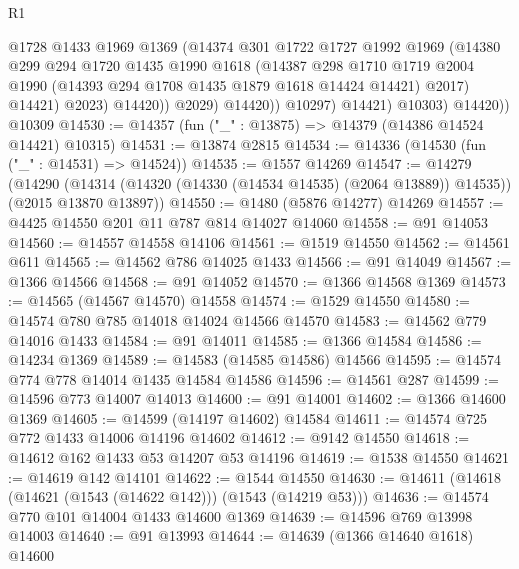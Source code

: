 \begin{lexlean}{R1}
\begin{coremodule}
                        @1728
                        @1433
                        @1969
                        @1369
                        (@14374
                          @301
                          @1722
                          @1727
                          @1992
                          @1969
                          (@14380
                            @299
                            @294
                            @1720
                            @1435
                            @1990
                            @1618
                            (@14387
                              @298
                              @1710
                              @1719
                              @2004
                              @1990
                              (@14393 @294 @1708 @1435 @1879 @1618 @14424 @14421)
                              @2017)
                            @14421)
                          @2023)
                        @14420))
                    @2029)
                  @14420))
              @10297)
            @14421)
          @10303)
        @14420))
    @10309
@14530 := @14357 (fun ("_" : @13875) => @14379 (@14386 @14524 @14421) @10315)
@14531 := @13874 @2815
@14534 := @14336 (@14530 (fun ("_" : @14531) => @14524))
@14535 := @1557 @14269
@14547 := @14279
    (@14290 (@14314 (@14320 (@14330 (@14534 @14535) (@2064 @13889)) @14535)) (@2015 @13870 @13897))
@14550 := @1480 (@5876 @14277) @14269
@14557 := @4425 @14550 @201 @11 @787 @814 @14027 @14060
@14558 := @91 @14053
@14560 := @14557 @14558 @14106
@14561 := @1519 @14550
@14562 := @14561 @611
@14565 := @14562 @786 @14025 @1433
@14566 := @91 @14049
@14567 := @1366 @14566
@14568 := @91 @14052
@14570 := @1366 @14568 @1369
@14573 := @14565 (@14567 @14570) @14558
@14574 := @1529 @14550
@14580 := @14574 @780 @785 @14018 @14024 @14566 @14570
@14583 := @14562 @779 @14016 @1433
@14584 := @91 @14011
@14585 := @1366 @14584
@14586 := @14234 @1369
@14589 := @14583 (@14585 @14586) @14566
@14595 := @14574 @774 @778 @14014 @1435 @14584 @14586
@14596 := @14561 @287
@14599 := @14596 @773 @14007 @14013
@14600 := @91 @14001
@14602 := @1366 @14600 @1369
@14605 := @14599 (@14197 @14602) @14584
@14611 := @14574 @725 @772 @1433 @14006 @14196 @14602
@14612 := @9142 @14550
@14618 := @14612 @162 @1433 @53 @14207 @53 @14196
@14619 := @1538 @14550
@14621 := @14619 @142 @14101
@14622 := @1544 @14550
@14630 := @14611 (@14618 (@14621 (@1543 (@14622 @142))) (@1543 (@14219 @53)))
@14636 := @14574 @770 @101 @14004 @1433 @14600 @1369
@14639 := @14596 @769 @13998 @14003
@14640 := @91 @13993
@14644 := @14639 (@1366 @14640 @1618) @14600

\end{coremodule}
\end{lexlean}
